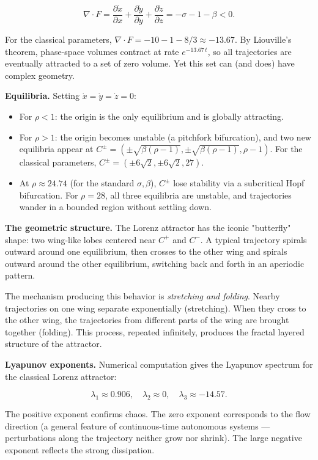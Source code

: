 \[
\nabla \cdot F = \frac{\partial \dot{x}}{\partial x} + \frac{\partial \dot{y}}{\partial y} + \frac{\partial \dot{z}}{\partial z} = -\sigma - 1 - \beta < 0.
\]

For the classical parameters, $\nabla \cdot F = -10 - 1 - 8/3 \approx -13.67$. By Liouville's theorem, phase-space volumes contract at rate $e^{-13.67 \, t}$, so all trajectories are eventually attracted to a set of zero volume. Yet this set can (and does) have complex geometry.

\textbf{Equilibria.} Setting $\dot{x} = \dot{y} = \dot{z} = 0$:

\begin{itemize}[nosep]
  \item For $\rho < 1$: the origin is the only equilibrium and is globally attracting.
  \item For $\rho > 1$: the origin becomes unstable (a pitchfork bifurcation), and two new equilibria appear at $C^{\pm} = (\pm\sqrt{\beta(\rho-1)}, \pm\sqrt{\beta(\rho-1)}, \rho-1)$. For the classical parameters, $C^{\pm} = (\pm 6\sqrt{2}, \pm 6\sqrt{2}, 27)$.
  \item At $\rho \approx 24.74$ (for the standard $\sigma, \beta$), $C^{\pm}$ lose stability via a subcritical Hopf bifurcation. For $\rho = 28$, all three equilibria are unstable, and trajectories wander in a bounded region without settling down.
\end{itemize}

\textbf{The geometric structure.} The Lorenz attractor has the iconic "butterfly" shape: two wing-like lobes centered near $C^+$ and $C^-$. A typical trajectory spirals outward around one equilibrium, then crosses to the other wing and spirals outward around the other equilibrium, switching back and forth in an aperiodic pattern.

The mechanism producing this behavior is \textit{stretching and folding}. Nearby trajectories on one wing separate exponentially (stretching). When they cross to the other wing, the trajectories from different parts of the wing are brought together (folding). This process, repeated infinitely, produces the fractal layered structure of the attractor.

\textbf{Lyapunov exponents.} Numerical computation gives the Lyapunov spectrum for the classical Lorenz attractor:

\[
\lambda_1 \approx 0.906, \quad \lambda_2 \approx 0, \quad \lambda_3 \approx -14.57.
\]

The positive exponent confirms chaos. The zero exponent corresponds to the flow direction (a general feature of continuous-time autonomous systems --- perturbations along the trajectory neither grow nor shrink). The large negative exponent reflects the strong dissipation.

